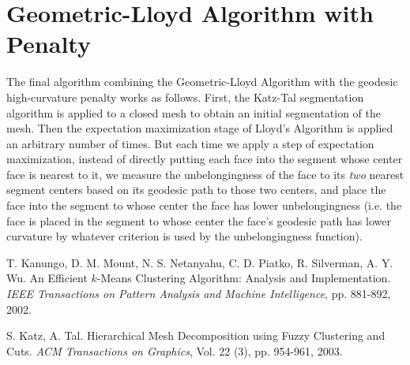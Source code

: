 \documentclass{article}
\begin{document}

\section{Geometric-Lloyd Algorithm with Penalty}
The final algorithm combining the Geometric-Lloyd Algorithm with the
geodesic high-curvature penalty works as follows.  First, the Katz-Tal
segmentation algorithm is applied to a closed mesh to obtain an initial
segmentation of the mesh.  Then the expectation maximization stage of Lloyd's
Algorithm is applied an arbitrary number of times.  But each time we apply
a step of expectation maximization, instead of directly putting each face
into the segment whose center face is nearest to it, we measure the
unbelongingness of the face to its {\em two} nearest segment centers based on
its geodesic path to those two centers, and place the face into the segment
to whose center the face has lower unbelongingness (i.e. the face is placed in
the segment to whose center the face's geodesic path has lower curvature by
whatever criterion is used by the unbelongingness function).


\begin{thebibliography}{99}

 T. Kanungo, D. M. Mount, N. S. Netanyahu, C. D. Piatko, R.
Silverman, A. Y. Wu.  An Efficient $k$-Means Clustering Algorithm: Analysis
and Implementation.  {\em IEEE Transactions on Pattern Analysis and Machine
Intelligence}, pp. 881-892, 2002.

 S. Katz, A. Tal.  Hierarchical Mesh Decomposition using
Fuzzy Clustering and Cuts.  {\em ACM Transactions on Graphics}, Vol. 22 (3),
pp. 954-961, 2003.

\end{thebibliography}

\end{document}
